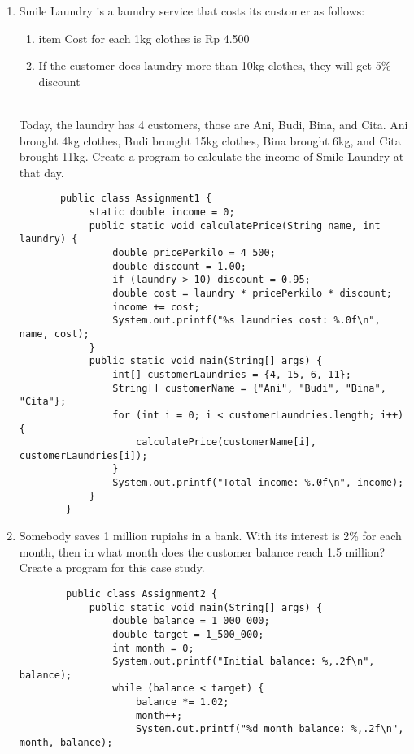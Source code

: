 \documentclass[12pt,titlepage]{article}
\begin{document}
\begin{enumerate}
    \item Smile Laundry is a laundry service that costs its customer as follows:
    \begin{enumerate}
        \item item Cost for each 1kg clothes is Rp 4.500
        \item If the customer does laundry more than 10kg clothes, they will get 5\% discount
    \end{enumerate}
    \mbox{}\\ 
    Today, the laundry has 4 customers, those are Ani, Budi, Bina, and Cita. Ani brought 4kg clothes, Budi brought 15kg clothes, Bina brought 6kg, and Cita brought 11kg. Create a program to calculate the income of Smile Laundry at that day.
    \begin{verbatim}
       public class Assignment1 {
            static double income = 0;
            public static void calculatePrice(String name, int laundry) {
                double pricePerkilo = 4_500;
                double discount = 1.00;
                if (laundry > 10) discount = 0.95;
                double cost = laundry * pricePerkilo * discount;
                income += cost; 
                System.out.printf("%s laundries cost: %.0f\n", name, cost);
            }
            public static void main(String[] args) {
                int[] customerLaundries = {4, 15, 6, 11};
                String[] customerName = {"Ani", "Budi", "Bina", "Cita"};
                for (int i = 0; i < customerLaundries.length; i++) {
                    calculatePrice(customerName[i], customerLaundries[i]);
                }
                System.out.printf("Total income: %.0f\n", income);
            }
        } 
    \end{verbatim}
    \item Somebody saves 1 million rupiahs in a bank. With its interest is 2\% for each month, then in what month does the customer balance reach 1.5 million? Create a program for this case study.
    \begin{verbatim}
        public class Assignment2 {
            public static void main(String[] args) {
                double balance = 1_000_000;
                double target = 1_500_000;
                int month = 0;
                System.out.printf("Initial balance: %,.2f\n", balance);
                while (balance < target) {
                    balance *= 1.02;
                    month++;
                    System.out.printf("%d month balance: %,.2f\n", month, balance);

\end{verbatim}
\end{enumerate}
\end{document}
